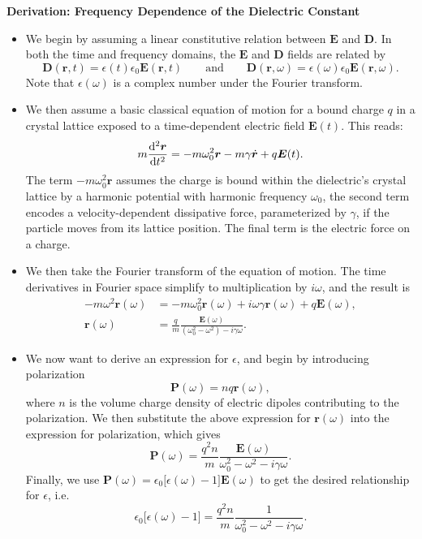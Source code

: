 \documentclass[11pt, a4paper]{article}
\renewcommand{\vec}[1]{\bm{#1}} %
\renewcommand{\r}{\vec{r}}
\newcommand{\E}{\vec{E}} %
\newcommand{\D}{\vec{D}}  %
\renewcommand{\P}{\vec{P}}  %
\newcommand{\ee}{\epsilon_{0}}  %
\begin{document}
\textbf{Derivation: Frequency Dependence of the Dielectric Constant}
\begin{itemize}

    \item We begin by assuming a linear constitutive relation between $ \E $ and $ \D $. In both the time and frequency domains, the $ \E $ and $ \D $ fields are related by
    \begin{equation*}
        \D(\r, t) = \epsilon(t)\epsilon_{0} \E(\r, t) \qquad \text{and} \qquad \D(\r, \omega) = \epsilon(\omega)\epsilon_{0}\E(\r, \omega).
    \end{equation*}
    Note that $ \epsilon(\omega) $ is a complex number under the Fourier transform.

    \item We then assume a basic classical equation of motion for a bound charge $ q $ in a crystal lattice exposed to a time-dependent electric field $ \E(t) $. This reads:
    \begin{equation*}
        m \dv[2]{\r}{t} = - m \omega_{0}^{2}\r - m\gamma \dot{\r} + q\E(t).
    \end{equation*}
    The term $ - m \omega_{0}^{2} \r $ assumes the charge is bound within the dielectric's crystal lattice by a harmonic potential with harmonic frequency $ \omega_{0} $, the second term encodes a velocity-dependent dissipative force, parameterized by $ \gamma $, if the particle moves from its lattice position. The final term is the electric force on a charge.

    \item We then take the Fourier transform of the equation of motion. The time derivatives in Fourier space simplify to multiplication by $ i\omega $, and the result is
    \begin{align*}
        -m\omega^{2}\r(\omega) &= - m\omega_{0}^{2}\r(\omega) + i\omega\gamma\r(\omega) + q\E(\omega),\\
        \r(\omega) &= \frac{q}{m} \frac{\E(\omega)}{(\omega_{0}^{2} - \omega^{2}) - i \gamma\omega}.
    \end{align*}

    \item We now want to derive an expression for $ \epsilon $, and begin by introducing polarization
    \begin{equation*}
        \P(\omega) = nq\r(\omega),
    \end{equation*}
    where $ n $ is the volume charge density of electric dipoles contributing to the polarization. We then substitute the above expression for $ \r(\omega) $ into the expression for polarization, which gives
    \begin{equation*}
        \P(\omega) = \frac{q^{2}n}{m} \frac{\E(\omega)}{\omega_{0}^{2} - \omega^{2} - i \gamma \omega}.
    \end{equation*}
    Finally, we use $ \P(\omega) = \ee \big[ \epsilon(\omega)-1 \big]\E(\omega) $ to get the desired relationship for $ \epsilon $, i.e.
    \begin{equation*}
        \ee \big[ \epsilon(\omega) -1 \big] = \frac{q^{2}n}{m} \frac{1}{\omega_{0}^{2} - \omega^{2} - i\gamma\omega}. 
    \end{equation*}
    

\end{itemize}
\end{document}
